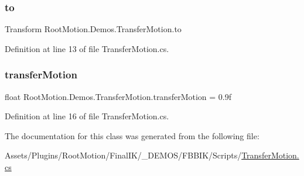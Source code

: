 \subsubsection{\texorpdfstring{to}{to}}
{\footnotesize\ttfamily Transform Root\+Motion.\+Demos.\+Transfer\+Motion.\+to}



Definition at line 13 of file Transfer\+Motion.\+cs.

\mbox{\label{class_root_motion_1_1_demos_1_1_transfer_motion_a8a0c39a4ed9c65e79730cd945094e9ed}} 
\subsubsection{\texorpdfstring{transfer\+Motion}{transferMotion}}
{\footnotesize\ttfamily float Root\+Motion.\+Demos.\+Transfer\+Motion.\+transfer\+Motion = 0.\+9f}



Definition at line 16 of file Transfer\+Motion.\+cs.



The documentation for this class was generated from the following file\+:\begin{DoxyCompactItemize}
\item 
Assets/\+Plugins/\+Root\+Motion/\+Final\+I\+K/\+\_\+\+D\+E\+M\+O\+S/\+F\+B\+B\+I\+K/\+Scripts/\mbox{\hyperlink{_transfer_motion_8cs}{Transfer\+Motion.\+cs}}\end{DoxyCompactItemize}
